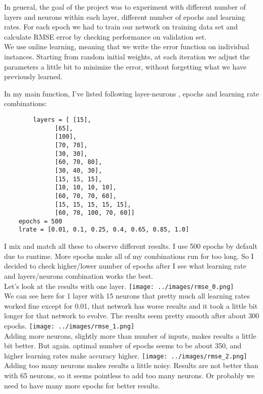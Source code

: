 \documentclass[12pt, letterpaper]{article}
\begin{document}
\begin{enumerate}[label=\Roman*.]
	In general, the goal of the project was to experiment with different number of layers and neurons within each layer, different number of epochs and learning rates. For each epoch we had to train our network on training data set and calculate RMSE error by checking performance on validation set. \\
	We use online learning, meaning that we write the error function on individual instances. Starting from random initial weights, at each iteration we adjust the parameters a little bit to minimize the error, without forgetting what we have previously learned.
	
	In my main function, I've listed following layer-neurons , epochs and learning rate combinations:
	\begin{verbatim}
	    layers = [ [15],
              [65],
              [100],
              [70, 70],
              [30, 30],
              [60, 70, 80],
              [30, 40, 30],
              [15, 15, 15],
              [10, 10, 10, 10],
              [60, 70, 70, 60],
              [15, 15, 15, 15, 15],
              [60, 70, 100, 70, 60]]
    epochs = 500
    lrate = [0.01, 0.1, 0.25, 0.4, 0.65, 0.85, 1.0]
	\end{verbatim}
	 I mix and match all these to observe different results. I use 500 epochs by default due to runtime. More epochs make all of my combinations run for too long. So I decided to check higher/lower number of epochs after I see what learning rate and layers/neurons combination works the best.\\
	 
	Let's look at the results with one layer.
	{\center \texttt{[image: ../images/rmse\_0.png]} \\}
	We can see here for 1 layer with 15 neurons that pretty much all learning rates worked fine except for 0.01, that network has worse results and it took a little bit longer for that network to evolve. The results seem pretty smooth after about 300 epochs.
	{\center \texttt{[image: ../images/rmse\_1.png]} \\}
	Adding more neurons, slightly more than number of inputs, makes results a little bit better. But again. optimal number of epochs seems to be about 350, and higher learning rates make accuracy higher.
	{\center \texttt{[image: ../images/rmse\_2.png]} \\}
	Adding too many neurons makes results a little noisy. Results are not better than with 65 neurons, so it seems pointless to add too many neurons. Or probably we need to have many more epochs for better results. \\
	

\end{enumerate}
\end{document}
